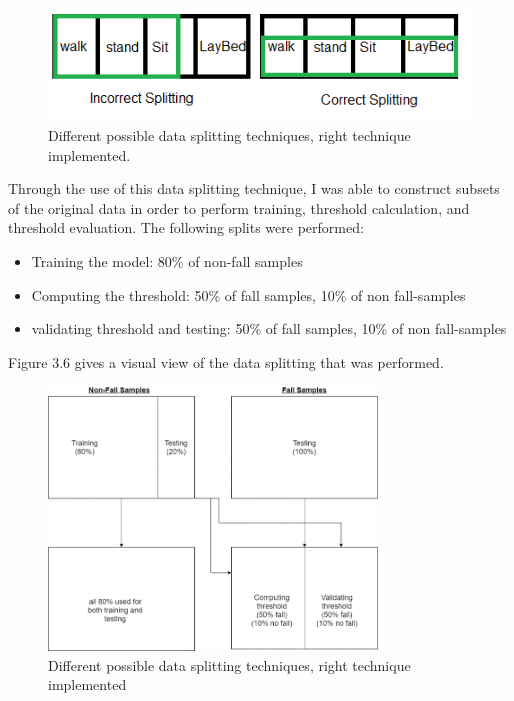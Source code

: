 \begin{figure}[H]
    \centering
    \includegraphics{split.png}
    \caption{Different possible data splitting techniques, right technique implemented.}
    \label{fig:my_label}
\end{figure}

Through the use of this data splitting technique, I was able to construct subsets of the original data in order to perform training, threshold calculation, and threshold evaluation. The following splits were performed:
\begin{itemize}
    \item Training the model: 80\% of non-fall samples
    \item Computing the threshold: 50\% of fall samples, 10\% of non fall-samples
    \item validating threshold and testing: 50\% of fall samples, 10\% of non fall-samples
\end{itemize}
Figure 3.6 gives a visual view of the data splitting that was performed.

\begin{figure}[H]
    \centering
    \includegraphics[width=330px, keepaspectratio=true]{splitting.png}
    \caption{Different possible data splitting techniques, right technique implemented}
    \label{fig:my_label}
\end{figure}

